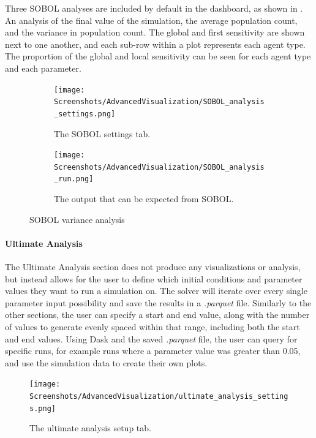 Three SOBOL analyses are included by default in the dashboard, as shown in .
An analysis of the final value of the simulation, the average population count, and the variance in population count.
The global and first sensitivity are shown next to one another, and each sub-row within a plot represents each agent type. 
The proportion of the global and local sensitivity can be seen for each agent type and each parameter.

\begin{figure}[!ht]
    \centering
    \begin{subfigure}{0.49\linewidth}
        \centering
        \vspace*{\fill}
        \texttt{[image: Screenshots/AdvancedVisualization/SOBOL\_analysis\_settings.png]}
        \caption{
            The SOBOL settings tab. 
        }
        \label{fig:ss:av:SOBOL_analysis_settings}
        \vspace*{\fill}
    \end{subfigure}
    \hfill
    \begin{subfigure}{0.49\linewidth}
        \centering
        \vspace*{\fill}
        \texttt{[image: Screenshots/AdvancedVisualization/SOBOL\_analysis\_run.png]}
        \caption{
            The output that can be expected from SOBOL. 
        }
        \label{fig:ss:av:SOBOL_analysis_run}
        \vspace*{\fill}
    \end{subfigure}
    \caption{SOBOL variance analysis}
\end{figure}

\paragraph{Ultimate Analysis}
\label{sec:ultimate_analysis}
The Ultimate Analysis section does not produce any visualizations or analysis, but instead allows for the user to define which initial conditions and parameter values they want to run a simulation on.
The solver will iterate over every single parameter input possibility and save the results in a \textit{.parquet} file.
Similarly to the other sections, the user can specify a start and end value, along with the number of values to generate evenly spaced within that range, including both the start and end values.
\newline
Using Dask and the saved \textit{.parquet} file, the user can query for specific runs, for example runs where a parameter value was greater than 0.05, and use the simulation data to create their own plots.
\begin{figure}
    \centering
    \texttt{[image: Screenshots/AdvancedVisualization/ultimate\_analysis\_settings.png]}
    \caption{
        The ultimate analysis setup tab. 
    }
    \label{fig:ss:av:ultimate_analysis_settings}
\end{figure}

